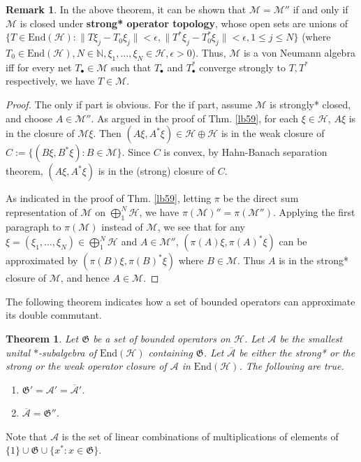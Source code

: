 \documentclass[12pt,b5paper,notitlepage]{article}
\theoremstyle{definition}
\newtheorem{rem}[df]{Remark}
\theoremstyle{plain}
\newtheorem{thm}[df]{Theorem}
\newcommand{\fk}{\mathfrak}
\newcommand{\mc}{\mathcal}
\newcommand{\ovl}{\overline}
\newcommand{\End}{\mathrm{End}} %
\newcommand{\blt}{\bullet}
\newcommand{\Nbb}{\mathbb N}
\numberwithin{equation}{section}
\begin{document}
\begin{rem}
In the above theorem, it can be shown that $\mc M=\mc M''$ if and only if $\mc M$ is closed under \textbf{strong* operator topology}, whose open sets are unions of $\{T\in\End(\mc H):\lVert T\xi_j-T_0\xi_j\lVert<\epsilon, \lVert T^*\xi_j-T_0^*\xi_j\lVert<\epsilon,1\leq j\leq N\}$ (where $T_0\in\End(\mc H),N\in\Nbb,\xi_1,\dots,\xi_N\in\mc H,\epsilon>0$). Thus, $\mc M$ is a von Neumann algebra iff for every net $T_\blt\in\mc M$ such that $T_\blt$ and $T_\blt^*$ converge strongly to $T,T^*$ respectively, we have $T\in\mc M$.
\end{rem}

\begin{proof}
The only if part is obvious. For the if part, assume $\mc M$ is strongly* closed, and choose $A\in\mc M''$. As argued in the proof of Thm. \ref{lb59}, for each $\xi\in\mc H$, $A\xi$ is in the closure of $\mc M\xi$. Then $(A\xi,A^*\xi)\in\mc H\oplus\mc H$ is in the weak closure of $C:=\{(B\xi,B^*\xi):B\in\mc M\}$. Since $C$ is convex, by Hahn-Banach separation theorem, $(A\xi,A^*\xi)$ is in the (strong) closure of $C$. 

As indicated in the proof of Thm. \ref{lb59}, letting $\pi$ be the direct sum representation of $\mc M$ on $\bigoplus_1^N\mc H$, we have $\pi(\mc M)''=\pi(\mc M'')$. Applying the first paragraph to $\pi(\mc M)$ instead of $\mc M$, we see that for any $\xi=(\xi_1,\dots,\xi_N)\in\bigoplus_1^N\mc H$ and $A\in\mc M''$, $(\pi(A)\xi,\pi(A)^*\xi)$ can be approximated by $(\pi(B)\xi,\pi(B)^*\xi)$ where $B\in\mc M$. Thus $A$ is in the strong* closure of $\mc M$, and hence $A\in\mc M$. 
\end{proof}









The following theorem indicates how a set of bounded operators can approximate its double commutant.

\begin{thm}\label{lb60}
Let $\fk G$ be a set of bounded operators on $\mc H$. Let $\mc A$ be the smallest unital $*$-subalgebra of $\End(\mc H)$ containing $\fk G$. Let $\ovl{\mc A}$ be either the strong* or the strong or the weak operator closure of $\mc A$ in $\End(\mc H)$. The following are true.
\begin{enumerate}
\item $\fk G'=\mc A'=\ovl{\mc A}'$.
\item $\ovl{\mc A}=\fk G''$.
\end{enumerate} 
\end{thm}
Note that $\mc A$ is the set of linear combinations of multiplications of elements of $\{1\}\cup\fk G\cup\{x^*:x\in\fk G\}$.
\end{document}
